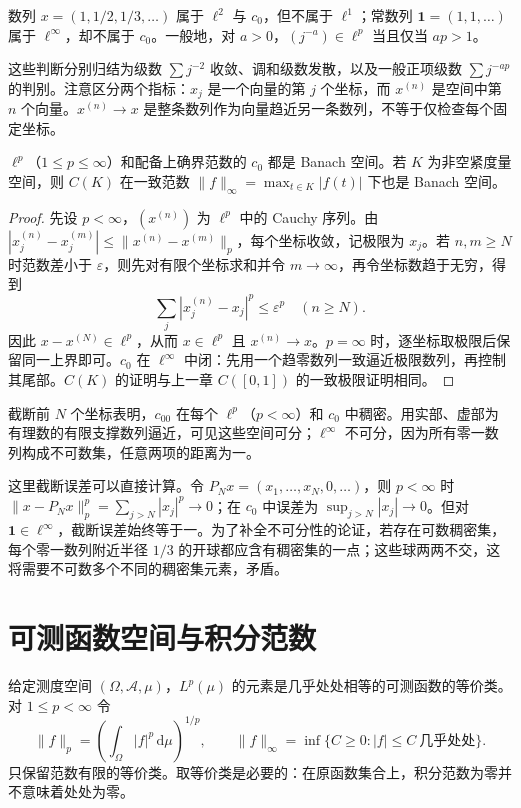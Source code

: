 \begin{example}[一个空间中的点本身也可以是数列]
数列 $x=(1,1/2,1/3,\ldots)$ 属于 $\ell^2$ 与 $c_0$，但不属于 $\ell^1$；常数列 $\boldsymbol 1=(1,1,\ldots)$ 属于 $\ell^\infty$，却不属于 $c_0$。一般地，对 $a>0$，$(j^{-a})\in\ell^p$ 当且仅当 $ap>1$。
\end{example}
\begin{solve}
这些判断分别归结为级数 $\sum j^{-2}$ 收敛、调和级数发散，以及一般正项级数 $\sum j^{-ap}$ 的判别。注意区分两个指标：$x_j$ 是一个向量的第 $j$ 个坐标，而 $x^{(n)}$ 是空间中第 $n$ 个向量。$x^{(n)}\to x$ 是整条数列作为向量趋近另一条数列，不等于仅检查每个固定坐标。
\end{solve}

\begin{proposition}\label{prop:fa-sequence-complete}
$\ell^p$（$1\leq p\leq\infty$）和配备上确界范数的 $c_0$ 都是 Banach 空间。若 $K$ 为非空紧度量空间，则 $C(K)$ 在一致范数 $\|f\|_\infty=\max_{t\in K}|f(t)|$ 下也是 Banach 空间。
\end{proposition}
\begin{proof}
先设 $p<\infty$，$(x^{(n)})$ 为 $\ell^p$ 中的 Cauchy 序列。由 $|x_j^{(n)}-x_j^{(m)}|\leq\|x^{(n)}-x^{(m)}\|_p$，每个坐标收敛，记极限为 $x_j$。若 $n,m\geq N$ 时范数差小于 $\varepsilon$，则先对有限个坐标求和并令 $m\to\infty$，再令坐标数趋于无穷，得到
\[
 \sum_j|x_j^{(n)}-x_j|^p\leq\varepsilon^p\quad(n\geq N).
\]
因此 $x-x^{(N)}\in\ell^p$，从而 $x\in\ell^p$ 且 $x^{(n)}\to x$。$p=\infty$ 时，逐坐标取极限后保留同一上界即可。$c_0$ 在 $\ell^\infty$ 中闭：先用一个趋零数列一致逼近极限数列，再控制其尾部。$C(K)$ 的证明与上一章 $C([0,1])$ 的一致极限证明相同。
\end{proof}
截断前 $N$ 个坐标表明，$c_{00}$ 在每个 $\ell^p$（$p<\infty$）和 $c_0$ 中稠密。用实部、虚部为有理数的有限支撑数列逼近，可见这些空间可分；$\ell^\infty$ 不可分，因为所有零一数列构成不可数集，任意两项的距离为一。

这里截断误差可以直接计算。令 $P_Nx=(x_1,\ldots,x_N,0,\ldots)$，则 $p<\infty$ 时 $\|x-P_Nx\|_p^p=\sum_{j>N}|x_j|^p\to0$；在 $c_0$ 中误差为 $\sup_{j>N}|x_j|\to0$。但对 $\boldsymbol1\in\ell^\infty$，截断误差始终等于一。为了补全不可分性的论证，若存在可数稠密集，每个零一数列附近半径 $1/3$ 的开球都应含有稠密集的一点；这些球两两不交，这将需要不可数多个不同的稠密集元素，矛盾。

\section{可测函数空间与积分范数}
给定测度空间 $(\Omega,\mathcal A,\mu)$，$L^p(\mu)$ 的元素是几乎处处相等的可测函数的等价类。对 $1\leq p<\infty$ 令
\[
 \|f\|_p=\left(\int_\Omega|f|^p\,\mathrm d\mu\right)^{1/p},
 \qquad
 \|f\|_\infty=\inf\{C\geq0:|f|\leq C\ \text{几乎处处}\}.
\]
只保留范数有限的等价类。取等价类是必要的：在原函数集合上，积分范数为零并不意味着处处为零。

